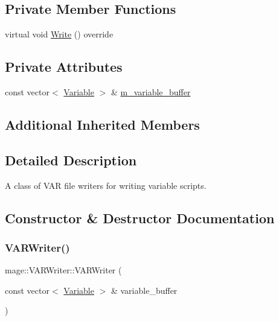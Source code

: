 \subsection*{Private Member Functions}
\begin{DoxyCompactItemize}
\item 
virtual void \hyperlink{classmage_1_1_v_a_r_writer_a964538c6447af667311276745da93d69}{Write} () override
\end{DoxyCompactItemize}
\subsection*{Private Attributes}
\begin{DoxyCompactItemize}
\item 
const vector$<$ \hyperlink{structmage_1_1_variable}{Variable} $>$ \& \hyperlink{classmage_1_1_v_a_r_writer_a7cfb811d496a6883478ddf680babaa7a}{m\+\_\+variable\+\_\+buffer}
\end{DoxyCompactItemize}
\subsection*{Additional Inherited Members}


\subsection{Detailed Description}
A class of V\+AR file writers for writing variable scripts. 

\subsection{Constructor \& Destructor Documentation}
\hypertarget{classmage_1_1_v_a_r_writer_a5ee1450f01948b70ab166e08f0969742}{}\label{classmage_1_1_v_a_r_writer_a5ee1450f01948b70ab166e08f0969742} 
\subsubsection{\texorpdfstring{V\+A\+R\+Writer()}{VARWriter()}\hspace{0.1cm}{\footnotesize\ttfamily [1/3]}}
{\footnotesize\ttfamily mage\+::\+V\+A\+R\+Writer\+::\+V\+A\+R\+Writer (\begin{DoxyParamCaption}\item[{const vector$<$ \hyperlink{structmage_1_1_variable}{Variable} $>$ \&}]{variable\+\_\+buffer }\end{DoxyParamCaption})\hspace{0.3cm}{\ttfamily [explicit]}}

